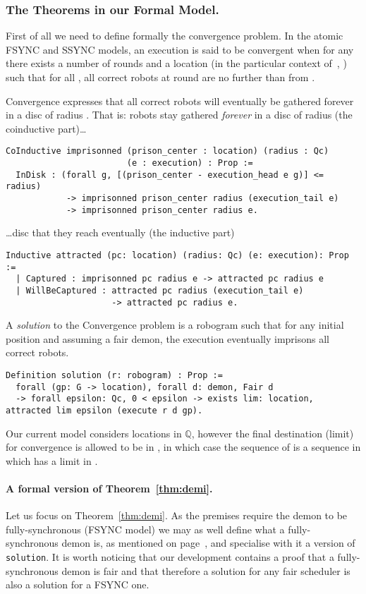 \documentclass[11pt,a4]{llncs}
\newcommand{\x}{\xspace}
\newcommand{\setQ}{\ensuremath{\mathbb{Q}}\x}
\begin{document}
\subsubsection*{The Theorems in our Formal Model.}\label{sec:formal_theorems}

First of all we need to define formally the convergence problem.
In the atomic FSYNC and SSYNC models,
an execution  is said to be convergent when
for any  there exists a number of
rounds
 and a location  (in the
particular context of~\cite{bouzid10tcs}, )
such that for all , all correct robots at round 
are no further than  from .

Convergence expresses that all correct robots will eventually be
gathered forever in a disc of radius .
That is: robots stay
gathered \emph{forever} in a disc of radius  (the
coinductive part)\ldots \begin{lstlisting}
CoInductive imprisonned (prison_center : location) (radius : Qc)
                        (e : execution) : Prop :=
  InDisk : (forall g, [(prison_center - execution_head e g)] <= radius)
            -> imprisonned prison_center radius (execution_tail e)
            -> imprisonned prison_center radius e.
\end{lstlisting}
\ldots disc that they reach eventually (the inductive part)
\begin{lstlisting}
Inductive attracted (pc: location) (radius: Qc) (e: execution): Prop :=
  | Captured : imprisonned pc radius e -> attracted pc radius e
  | WillBeCaptured : attracted pc radius (execution_tail e) 
                     -> attracted pc radius e.
\end{lstlisting}
A \emph{solution} to the Convergence problem is a robogram such that for any initial position and assuming a fair demon, the
execution eventually imprisons all correct robots.
\begin{lstlisting}
Definition solution (r: robogram) : Prop := 
  forall (gp: G -> location), forall d: demon, Fair d
  -> forall epsilon: Qc, 0 < epsilon -> exists lim: location, attracted lim epsilon (execute r d gp).
\end{lstlisting}

\begin{remark}\label{rem:limitR}
  Our current model considers locations in \setQ, however the final
  destination (limit) for convergence is allowed to be in , in which case the
  sequence of  is a sequence in  which has a
  limit in .
\end{remark}

\paragraph{A formal version of Theorem~\ref{thm:demi}.}\label{sec:formal_demi}
Let us focus on Theorem~\ref{thm:demi}. As the premises require the
demon to be fully-synchronous (FSYNC model) we may as well define what
a fully-synchronous demon is, as mentioned on page~\pageref{page:formal_fsync}, and specialise with it a version of
\lstinline!solution!. It is worth noticing that our development contains a proof that a
fully-synchronous demon is fair and that therefore a solution for any
fair scheduler is also a solution for a FSYNC one.
\end{document}
